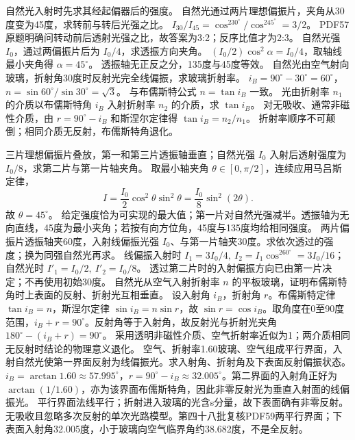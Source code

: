 \crosscheck 自然光入射时先求其经起偏器后的强度。
\problemtext 自然光通过两片理想偏振片，夹角从30度变为45度，求转前与转后光强之比。
\workings $I_{30}/I_{45}=\cos^230^\circ/\cos^245^\circ=3/2$。
\crosscheck PDF57原题明确问转动前后透射光强之比，故答案为3:2；反序比值才为2:3。
\problemtext 自然光强 $I_0$，通过两偏振片后为 $I_0/4$，求透振方向夹角。
\workings $(I_0/2)\cos^2\alpha=I_0/4$，取轴线最小夹角得 $\alpha=45^\circ$。
\crosscheck 透振轴无正反之分，135度与45度等效。
\problemtext 自然光由空气射向玻璃，折射角30度时反射光完全线偏振，求玻璃折射率。
\workings $i_B=90^\circ-30^\circ=60^\circ$，$n=\sin60^\circ/\sin30^\circ=\sqrt3$。
\crosscheck 与布儒斯特公式 $n=\tan i_B$ 一致。
\problemtext 光由折射率 $n_1$ 的介质以布儒斯特角 $i_B$ 入射折射率 $n_2$ 的介质，求 $\tan i_B$。
\workings 对无吸收、通常非磁性介质，由 $r=90^\circ-i_B$ 和斯涅尔定律得 $\tan i_B=n_2/n_1$。
\crosscheck 折射率顺序不可颠倒；相同介质无反射，布儒斯特角退化。

\problemtext 三片理想偏振片叠放，第一和第三片透振轴垂直；自然光强 $I_0$ 入射后透射强度为 $I_0/8$，求第二片与第一片轴夹角。
\workings 取最小轴夹角 $\theta\in[0,\pi/2]$，连续应用马吕斯定律，
\[
I=\frac{I_0}{2}\cos^2\theta\sin^2\theta=\frac{I_0}{8}\sin^2(2\theta).
\]
故 $\theta=45^\circ$。
\crosscheck 给定强度恰为可实现的最大值；第一片对自然光强减半。透振轴为无向直线，45度为最小夹角；若按有向方位角，45度与135度均给相同强度。
\problemtext 两片偏振片透振轴夹60度，入射线偏振光强 $I_0$、与第一片轴夹30度。求依次透过的强度；换为同强自然光再求。
\workings 线偏振入射时 $I_1=3I_0/4,\ I_2=I_1\cos^260^\circ=3I_0/16$；自然光时 $I'_1=I_0/2,\ I'_2=I_0/8$。
\crosscheck 透过第二片时的入射偏振方向已由第一片决定；不再使用初始30度。
\problemtext 自然光从空气入射折射率 $n$ 的平板玻璃，证明布儒斯特角时上表面的反射、折射光互相垂直。
\workings 设入射角 $i_B$，折射角 $r$。布儒斯特定律 $\tan i_B=n$，斯涅尔定律 $\sin i_B=n\sin r$，故 $\sin r=\cos i_B$。取角度在0至90度范围，$i_B+r=90^\circ$。反射角等于入射角，故反射光与折射光夹角 $180^\circ-(i_B+r)=90^\circ$。
\crosscheck 采用透明非磁性介质、空气折射率近似为1；两介质相同无反射时结论的物理意义退化。
\problemtext 空气、折射率1.60玻璃、空气组成平行界面，入射自然光使第一界面反射为线偏振光。求入射角、折射角及下表面反射偏振状态。
\workings $i_B=\arctan1.60\approx57.995^\circ$，$r=90^\circ-i_B\approx32.005^\circ$。第二界面的入射角正好为 $\arctan(1/1.60)$，亦为该界面布儒斯特角，因此非零反射光为垂直入射面的线偏振光。
\crosscheck 平行界面法线平行；折射进入玻璃的光含s分量，故下表面确有非零反射。无吸收且忽略多次反射的单次光路模型。第四十八批复核PDF59两平行界面；下表面入射角32.005度，小于玻璃向空气临界角约38.682度，不是全反射。
